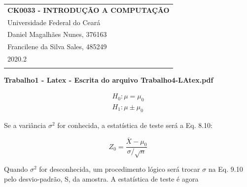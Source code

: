 \documentclass[a4paper,12pt]{article} %
\begin{document}
	
	
	\thispagestyle{empty} %
	
	\begin{tabular}{p{15.5cm}} %
		{\large \bf CK0033 - INTRODUÇÃO A COMPUTAÇÃO} \\
		 Universidade Federal do Ceará \\ 
		 Daniel Magalhães Nunes, 376163 \\
		 Francilene da Silva Sales, 485249 \\ 2020.2 \\
		\hline %
		\\
	\end{tabular} %
	
	\vspace*{0.3cm} %
	
	\begin{center} %
		{\Large \bf Trabalho1 - Latex - Escrita do arquivo Trabalho4-LAtex.pdf} %
		\vspace{2mm}
		
	\end{center}  

	\vspace{0.4cm}
	
	\begin{align*}
			H_0: \mu = \mu_0 \\
			H_1: \mu \pm \mu_0
	\end{align*}

	Se a variância $\sigma^2$ for conhecida, a estatística de teste será a Eq. 8.10:
	
	\begin{equation*}
		Z_0 = \frac{\overline{X} - \mu_0}{\sigma / \sqrt{n}}
	\end{equation*}

	Quando $\sigma^2$ for desconhecida, um procedimento lógico será trocar $\sigma$ na Eq. 9.10 pelo desvio-padrão, S, da amostra. A estatística de teste é agora
	
\end{document}
